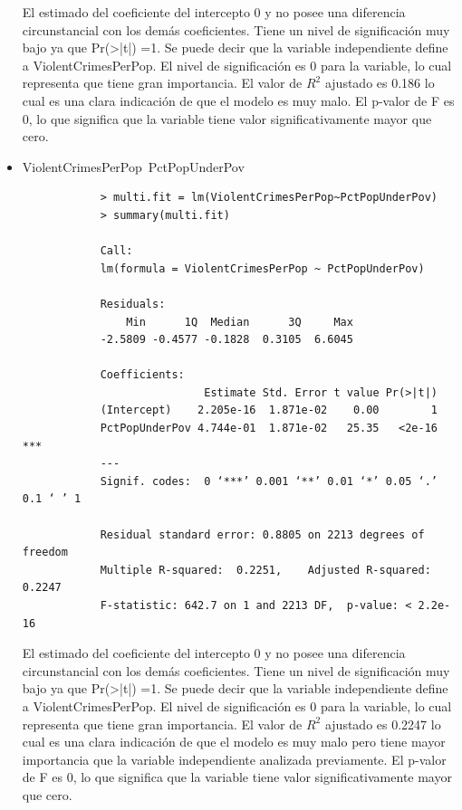 \documentclass[a4paper,10pt,twocolumn]{article}
\begin{document}
\begin{itemize}
	El estimado del coeficiente del intercepto 0 y no posee una diferencia circunstancial con los demás coeficientes. Tiene un nivel de significación muy bajo ya que Pr(>|t|) =1.
	Se puede decir que la variable independiente define a ViolentCrimesPerPop. El nivel de significación es 0 para la variable, lo cual representa que tiene gran importancia. El valor de $R^2$ ajustado es 0.186 lo cual es una clara indicación de que el modelo es muy malo. El p-valor de F es 0, lo que significa que la variable tiene valor significativamente mayor que cero.

	\item {ViolentCrimesPerPop~PctPopUnderPov}

		\begin{verbatim}
			> multi.fit = lm(ViolentCrimesPerPop~PctPopUnderPov)
			> summary(multi.fit)

			Call:
			lm(formula = ViolentCrimesPerPop ~ PctPopUnderPov)

			Residuals:
				Min      1Q  Median      3Q     Max 
			-2.5809 -0.4577 -0.1828  0.3105  6.6045 

			Coefficients:
							Estimate Std. Error t value Pr(>|t|)    
			(Intercept)    2.205e-16  1.871e-02    0.00        1    
			PctPopUnderPov 4.744e-01  1.871e-02   25.35   <2e-16 ***
			---
			Signif. codes:  0 ‘***’ 0.001 ‘**’ 0.01 ‘*’ 0.05 ‘.’ 0.1 ‘ ’ 1

			Residual standard error: 0.8805 on 2213 degrees of freedom
			Multiple R-squared:  0.2251,	Adjusted R-squared:  0.2247 
			F-statistic: 642.7 on 1 and 2213 DF,  p-value: < 2.2e-16
		\end{verbatim}

	El estimado del coeficiente del intercepto 0 y no posee una diferencia circunstancial con los demás coeficientes. Tiene un nivel de significación muy bajo ya que Pr(>|t|) =1.
	Se puede decir que la variable independiente define a ViolentCrimesPerPop. El nivel de significación es 0 para la variable, lo cual representa que tiene gran importancia. El valor de $R^2$ ajustado es 0.2247 lo cual es una clara indicación de que el modelo es muy malo pero tiene mayor importancia que la variable independiente analizada previamente. El p-valor de F es 0, lo que significa que la variable tiene valor significativamente mayor que cero.

\end{itemize}
\end{document}

